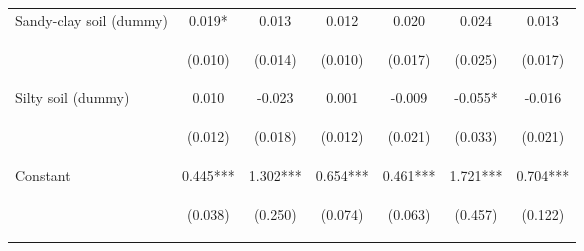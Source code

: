 \begin{center}
\begin{tabular}{lcccccc}
Sandy-clay soil (dummy) & 0.019* & 0.013 & 0.012 & 0.020 & 0.024 & 0.013 \\
\vspace{4pt} & \begin{footnotesize}(0.010)\end{footnotesize} & \begin{footnotesize}(0.014)\end{footnotesize} & \begin{footnotesize}(0.010)\end{footnotesize} & \begin{footnotesize}(0.017)\end{footnotesize} & \begin{footnotesize}(0.025)\end{footnotesize} & \begin{footnotesize}(0.017)\end{footnotesize} \\
Silty soil (dummy) & 0.010 & -0.023 & 0.001 & -0.009 & -0.055* & -0.016 \\
\vspace{4pt} & \begin{footnotesize}(0.012)\end{footnotesize} & \begin{footnotesize}(0.018)\end{footnotesize} & \begin{footnotesize}(0.012)\end{footnotesize} & \begin{footnotesize}(0.021)\end{footnotesize} & \begin{footnotesize}(0.033)\end{footnotesize} & \begin{footnotesize}(0.021)\end{footnotesize} \\
Constant & 0.445*** & 1.302*** & 0.654*** & 0.461*** & 1.721*** & 0.704*** \\
 & \begin{footnotesize}(0.038)\end{footnotesize} & \begin{footnotesize}(0.250)\end{footnotesize} & \begin{footnotesize}(0.074)\end{footnotesize} & \begin{footnotesize}(0.063)\end{footnotesize} & \begin{footnotesize}(0.457)\end{footnotesize} & \begin{footnotesize}(0.122)\end{footnotesize} \\

\end{tabular}
\end{center}
